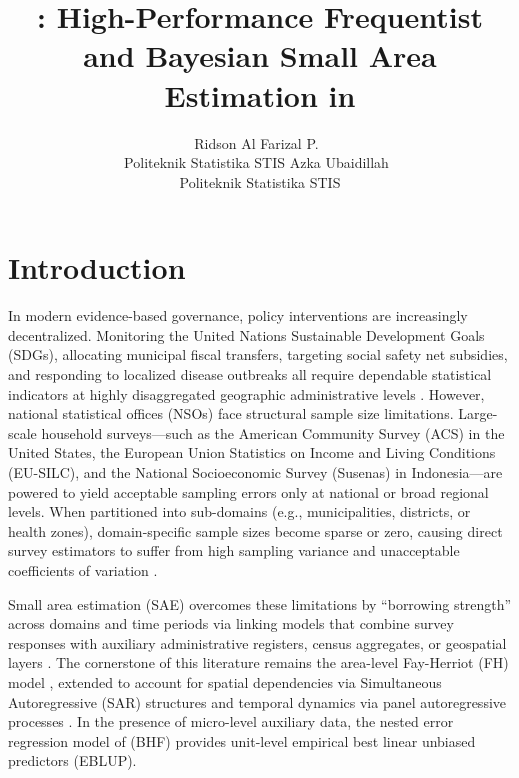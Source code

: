 \documentclass[article]{jss}
\author{Ridson Al Farizal P.~\orcidlink{0000-0003-0617-0214}\\Politeknik Statistika STIS
   \And Azka Ubaidillah~\orcidlink{0000-0002-3597-0459}\\Politeknik Statistika STIS}
\title{\pkg{fastsae}: High-Performance Frequentist and Bayesian Small Area Estimation in \proglang{R}}
\begin{document}

\section{Introduction} \label{sec:intro}

In modern evidence-based governance, policy interventions are increasingly decentralized. Monitoring the United Nations Sustainable Development Goals (SDGs), allocating municipal fiscal transfers, targeting social safety net subsidies, and responding to localized disease outbreaks all require dependable statistical indicators at highly disaggregated geographic administrative levels \citep{rao2015small, pfeffermann2013new}. However, national statistical offices (NSOs) face structural sample size limitations. Large-scale household surveys---such as the American Community Survey (ACS) in the United States, the European Union Statistics on Income and Living Conditions (EU-SILC), and the National Socioeconomic Survey (Susenas) in Indonesia---are powered to yield acceptable sampling errors only at national or broad regional levels. When partitioned into sub-domains (e.g., municipalities, districts, or health zones), domain-specific sample sizes become sparse or zero, causing direct survey estimators to suffer from high sampling variance and unacceptable coefficients of variation \citep{burgard2020computational, pratesi2016analysis}.

Small area estimation (SAE) overcomes these limitations by ``borrowing strength'' across domains and time periods via linking models that combine survey responses with auxiliary administrative registers, census aggregates, or geospatial layers \citep{rao2015small}. The cornerstone of this literature remains the area-level Fay-Herriot (FH) model \citep{fay1979estimates}, extended to account for spatial dependencies via Simultaneous Autoregressive (SAR) structures \citep{petrucci2006small, pratesi2008small} and temporal dynamics via panel autoregressive processes \citep{marhuenda2013small}. In the presence of micro-level auxiliary data, the nested error regression model of \citet{battese1988error} (BHF) provides unit-level empirical best linear unbiased predictors (EBLUP).
\end{document}
